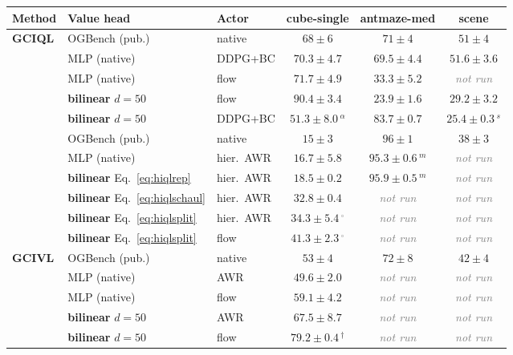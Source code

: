 \documentclass[11pt]{article}
\makeatletter
\newcommand{\B}[1]{\textbf{#1}}
\newcommand{\loc}[1]{\textcolor{locgreen}{#1}}
\newcommand{\pub}[1]{\textcolor{puborange}{#1}}
\newcommand{\win}[1]{\B{\loc{#1}}}   %
\newcommand{\nr}{\textcolor{gray}{\emph{not run}}}
\newcommand{\inflight}[1]{\loc{#1}\,\textcolor{gray}{$^{\circ}$}} %
\makeatother
\begin{document}
\begin{table}[h]
\centering
\small
\setlength{\tabcolsep}{4.5pt}
\begin{tabular}{@{}l l l ccc@{}}
\toprule
Method & Value head & Actor & cube-single & antmaze-med & scene \\
\midrule
\multirow{6}{*}{\B{GCIQL}}
 & \pub{OGBench (pub.)} & native      & \pub{$68\pm6$}   & \pub{$71\pm4$}   & \pub{$51\pm4$} \\
 & MLP (native)         & DDPG+BC     & \loc{$70.3\pm4.7$}& \loc{$69.5\pm4.4$}& \loc{$51.6\pm3.6$} \\
 & MLP (native)         & flow        & \loc{$71.7\pm4.9$}& \loc{$33.3\pm5.2$}& \nr \\
 & \B{bilinear} $d{=}50$& flow        & \win{$90.4\pm3.4$}& \loc{$23.9\pm1.6$}& \loc{$29.2\pm3.2$} \\
 & \B{bilinear} $d{=}50$& DDPG+BC     & \loc{$51.3\pm8.0$}\,$^{\alpha}$& \win{$83.7\pm0.7$}& \loc{$25.4\pm0.3$}\,$^{s}$ \\
\midrule
\multirow{6}{*}{\B{HIQL}}
 & \pub{OGBench (pub.)} & native          & \pub{$15\pm3$}   & \pub{$96\pm1$}   & \pub{$38\pm3$} \\
 & MLP (native)         & hier.\ AWR      & \loc{$16.7\pm5.8$}& \loc{$95.3\pm0.6$}\,$^{m}$ & \nr \\
 & \B{bilinear} Eq.~\eqref{eq:hiqlrep} & hier.\ AWR & \loc{$18.5\pm0.2$}& \loc{$95.9\pm0.5$}\,$^{m}$ & \nr \\
 & \B{bilinear} Eq.~\eqref{eq:hiqlschaul} & hier.\ AWR & \win{$32.8\pm0.4$}& \nr & \nr \\
 & \B{bilinear} Eq.~\eqref{eq:hiqlsplit} & hier.\ AWR & \win{\inflight{$34.3\pm5.4$}}& \nr & \nr \\
 & \B{bilinear} Eq.~\eqref{eq:hiqlsplit} & flow       & \win{\inflight{$41.3\pm2.3$}}& \nr & \nr \\
\midrule
\multirow{5}{*}{\B{GCIVL}}
 & \pub{OGBench (pub.)} & native      & \pub{$53\pm4$}   & \pub{$72\pm8$}   & \pub{$42\pm4$} \\
 & MLP (native)         & AWR         & \loc{$49.6\pm2.0$}& \nr & \nr \\
 & MLP (native)         & flow        & \loc{$59.1\pm4.2$}& \nr & \nr \\
 & \B{bilinear} $d{=}50$& AWR         & \win{$67.5\pm8.7$}& \nr & \nr \\
 & \B{bilinear} $d{=}50$& flow        & \win{$79.2\pm0.4$}\,$^\dagger$& \nr & \nr \\
\bottomrule
\end{tabular}

\end{table}
\end{document}
